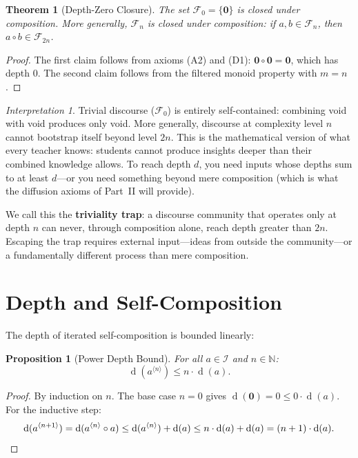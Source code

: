 \documentclass[11pt,openany]{book}
\theoremstyle{definition}
\theoremstyle{plain}
\newtheorem{theorem}[axiom]{Theorem}
\newtheorem{proposition}[axiom]{Proposition}
\theoremstyle{remark}
\newtheorem{interpretation}[axiom]{Interpretation}
\newcommand{\IS}{\mathcal{I}}               %
\newcommand{\compose}{\circ}                 %
\newcommand{\void}{\mathbf{0}}              %
\newcommand{\depth}{\operatorname{d}}       %
\newcommand{\compN}[2]{#1^{\langle #2 \rangle}} %
\newcommand{\Filt}[1]{\mathcal{F}_{#1}}     %
\begin{document}
\begin{theorem}[Depth-Zero Closure]
\label{thm:depth-zero}
The set $\Filt{0} = \{\void\}$ is closed under composition. More generally, $\Filt{n}$ is closed under composition: if $a, b \in \Filt{n}$, then $a \compose b \in \Filt{2n}$.
\end{theorem}

\begin{proof}
The first claim follows from axioms (A2) and (D1): $\void \compose \void = \void$, which has depth $0$. The second claim follows from the filtered monoid property with $m = n$.
\end{proof}

\begin{interpretation}
Trivial discourse ($\Filt{0}$) is entirely self-contained: combining void with void produces only void. More generally, discourse at complexity level $n$ cannot bootstrap itself beyond level $2n$. This is the mathematical version of what every teacher knows: students cannot produce insights deeper than their combined knowledge allows. To reach depth $d$, you need inputs whose depths sum to at least $d$---or you need something beyond mere composition (which is what the diffusion axioms of Part~II will provide).

We call this the \textbf{triviality trap}: a discourse community that operates only at depth $n$ can never, through composition alone, reach depth greater than $2n$. Escaping the trap requires external input---ideas from outside the community---or a fundamentally different process than mere composition.
\end{interpretation}

\section{Depth and Self-Composition}

The depth of iterated self-composition is bounded linearly:

\begin{proposition}[Power Depth Bound]
\label{prop:power-depth}
For all $a \in \IS$ and $n \in \mathbb{N}$:
\[
\depth(\compN{a}{n}) \leq n \cdot \depth(a).
\]
\end{proposition}

\begin{proof}
By induction on $n$. The base case $n = 0$ gives $\depth(\void) = 0 \leq 0 \cdot \depth(a)$. For the inductive step:
\[
\depth(\compN{a}{n+1}) = \depth(\compN{a}{n} \compose a) \leq \depth(\compN{a}{n}) + \depth(a) \leq n \cdot \depth(a) + \depth(a) = (n+1) \cdot \depth(a). \qedhere
\]
\end{proof}
\end{document}
